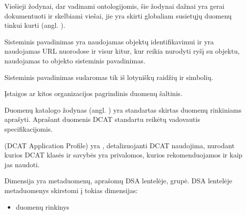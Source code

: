 \documentclass[letterpaper,10pt,lithuanian]{sphinxmanual}
\begin{document}
\begin{description}
\sphinxAtStartPar
Viešieji žodynai, dar vadinami ontologijomis, šie žodynai dažnai yra
gerai dokumentuoti ir skelbiami viešai, jie yra skirti globaliam
susietųjų duomenų tinkui kurti (angl. ).

\sphinxAtStartPar
Sisteminis pavadinimas yra naudojamas objektų identifikavimui ir yra
naudojamas URL nuorodose ir visur kitur, kur reikia nurodyti ryšį su
objektu, naudojamas to objekto sisteminis pavadinimas.

\sphinxAtStartPar
Sisteminis pavadinimas sudaromas tik iš lotyniškų raidžių ir \sphinxtitleref{\sphinxhyphen{}\_/}
simbolių.

\sphinxAtStartPar
Įstaigos ar kitos organizacijos pagrindinis duomenų šaltinis.

\sphinxAtStartPar
Duomenų katalogo žodynas (angl. )  yra
standartas skirtas duomenų rinkiniams aprašyti. Aprašant duomenis DCAT
standartu reikėtų vadovautis {\hyperref[\detokenize{savokos:term-DCAT-AP}]{}} specifikacijomis.

\sphinxAtStartPar
{} (DCAT Application Profile) yra , detalizuojanti
DCAT naudojima, nurodant kurios DCAT klasės ir savybės yra privalomos,
kurios rekomenduojamos ir kaip jas naudoti.

\sphinxAtStartPar
Dimensija yra metaduomenų, aprašomų DSA lentelėje, grupė. DSA lentelėje
metaduomenys skirstomi į tokias dimensijas:
\begin{itemize}
\item {} 
\sphinxAtStartPar
duomenų rinkinys


\end{itemize}
\end{description}
\end{document}
